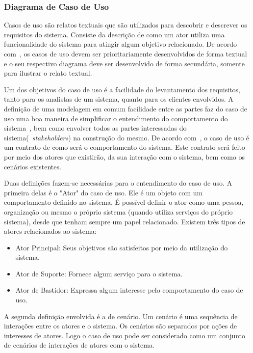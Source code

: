 \subsubsection{Diagrama de Caso de Uso}
Casos de uso são relatos textuais que são utilizados para descobrir e descrever os requisitos do sistema. Consiste da descrição de como um ator utiliza uma funcionalidade do sistema para atingir algum objetivo relacionado. De acordo com~\cite{larman08}, os casos de uso devem ser prioritariamente desenvolvidos de forma textual e o seu respectivo diagrama deve ser desenvolvido de forma secundária, somente para ilustrar o relato textual.

Um dos objetivos do caso de uso é a facilidade do levantamento dos requisitos, tanto para os analistas de um sistema, quanto para os clientes envolvidos. A definição de uma modelagem em comum facilidade entre as partes faz do caso de uso uma boa maneira de simplificar o entendimento do comportamento do sistema~\cite{larman08}, bem como envolver todos as partes interessadas do sistema(~\emph{stakeholders}) na construção do mesmo. De acordo com~\cite{cockburn01}, o caso de uso é um contrato de como será o comportamento do sistema. Este contrato será feito por meio dos atores que existirão, da sua interação com o sistema, bem como os cenários existentes.

Duas definições fazem-se necessárias para o entendimento do caso de uso. A primeira delas é o "Ator" do caso de uso. Ele é um objeto com um comportamento definido no sistema. É possível definir o ator como uma pessoa, organização ou mesmo o próprio sistema (quando utiliza serviços do próprio sistema), desde que tenham sempre um papel relacionado. Existem três tipos de atores relacionados ao sistema:
\begin{itemize}
	\item Ator Principal: Seus objetivos são satisfeitos por meio da utilização do sistema.
	\item Ator de Suporte: Fornece algum serviço para o sistema.
	\item Ator de Bastidor: Expressa algum interesse pelo comportamento do caso de uso.
\end{itemize}

A segunda definição envolvida é a de cenário. Um cenário é uma sequência de interações entre os atores e o sistema. Os cenários são separados por ações de interesses de atores. Logo o caso de uso pode ser considerado como um conjunto de cenários de interações de atores com o sistema.

